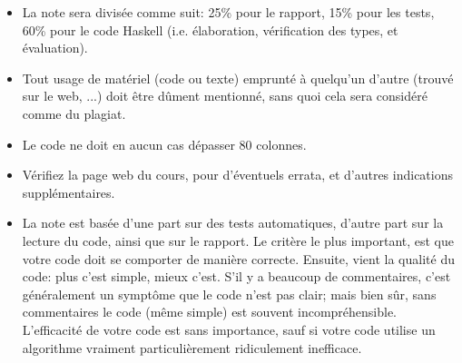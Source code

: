 \documentclass{article}
\begin{document}
\begin{itemize}
\item La note sera divisée comme suit: 25\% pour le rapport, 15\% pour les
  tests, 60\% pour le code Haskell (i.e. élaboration, vérification des
  types, et évaluation).
\item Tout usage de matériel (code ou texte) emprunté à quelqu'un d'autre
  (trouvé sur le web, ...) doit être dûment mentionné, sans quoi cela sera
  considéré comme du plagiat.
\item Le code ne doit en aucun cas dépasser 80 colonnes.
\item Vérifiez la page web du cours, pour d'éventuels errata, et d'autres
  indications supplémentaires.
\item La note est basée d'une part sur des tests automatiques, d'autre part
  sur la lecture du code, ainsi que sur le rapport.  Le critère le plus
  important, est que votre code doit se comporter de manière correcte.
  Ensuite, vient la qualité du code: plus c'est simple, mieux c'est.
  S'il y a beaucoup de commentaires, c'est généralement un symptôme que le
  code n'est pas clair; mais bien sûr, sans commentaires le code (même
  simple) est souvent incompréhensible.  L'efficacité de votre code est sans
  importance, sauf %
  si votre code utilise un algorithme vraiment
  particulièrement ridiculement inefficace.
\end{itemize}
\end{document}
